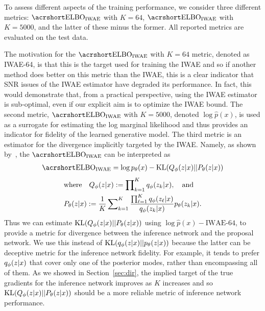 To assess different aspects of the training performance, we consider three
different metrics: $\ELBO_{\text{IWAE}}$ with $K=64$, 
$\ELBO_{\text{IWAE}}$ with $K=5000$, and the latter of these minus
 the former.  All reported metrics are evaluated on the test data.

The motivation for the  $\ELBO_{\text{IWAE}}$ with $K=64$ metric,
denoted as \gls{IWAE}-64, is that this is the target
used for training the \gls{IWAE} and so if another method does better on
this metric than the \gls{IWAE}, this is a clear indicator that \gls{SNR} issues
of the \gls{IWAE} estimator have degraded its performance.   In fact, 
this would demonstrate that, from a practical perspective, 
using the \gls{IWAE} estimator is sub-optimal, even if our explicit aim is to
optimize the \gls{IWAE} bound.  
The second metric, $\ELBO_{\text{IWAE}}$ with $K=5000$, denoted $\log \hat{p}(x)$, is used as a surrogate
for estimating the log marginal likelihood and thus provides an indicator
for fidelity of the learned generative model.  
The third metric is an
estimator for the divergence implicitly targeted by the \gls{IWAE}.  Namely, as shown
by~\citet{Le2017auto}, the $\ELBO_{\text{IWAE}}$ can be interpreted as
\begin{align}
\ELBO_{\text{IWAE}} = 
\log p_{\theta}(x) - \mathrm{KL}(Q_{\phi}(z \given x) || P_{\theta}(z \given x))
\end{align}
\begin{align}
&\text{where} \quad Q_{\phi}(z \lvert x) := \prod\nolimits_{k = 1}^K q_{\phi}(z_k \lvert x),
\quad \text{and} \\
&P_{\theta}(z \lvert x) := \frac{1}{K} \sum\nolimits_{k = 1}^K \frac{\prod_{\ell = 1}^K q_{\phi}(z_{\ell} \lvert x)}{q_{\phi}(z_k \lvert x)} p_{\theta}(z_k\lvert x).
\end{align}
Thus we can estimate $\mathrm{KL}(Q_{\phi}(z \lvert x) || P_{\theta}(z \lvert x))$
using $\log \hat{p}(x)-{\text{IWAE-64}}$, to provide a
metric for divergence between the inference network and the
 proposal network.  
We use this instead of
$\mathrm{KL}(q_{\phi}(z \lvert x) || p_{\theta}(z \lvert x))$
because the latter can be deceptive metric for the inference network
fidelity.  For example, it tends to 
prefer $q_{\phi}(z \lvert x)$ that cover only one of the posterior modes, rather than
encompassing all of them.  As we showed in Section~\ref{sec:dir}, the implied target 
of the true gradients for the inference network improves as $K$ increases and so 
$\mathrm{KL}(Q_{\phi}(z \lvert x) || P_{\theta}(z \lvert x))$ should be a more reliable
metric of inference network performance.


